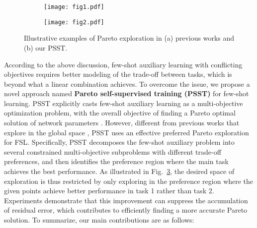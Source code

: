 \documentclass[final]{cvpr}
\begin{document}
\begin{figure}
	
	\begin{subfigure}{0.46\linewidth}
		\texttt{[image: fig1.pdf]}\label{ablation}
 
		\caption{}
	\end{subfigure}
	\begin{subfigure}{0.46\linewidth}
		\texttt{[image: fig2.pdf]}\label{entropy}
 
		\caption{}
	\end{subfigure}
	\caption{Illustrative examples of Pareto exploration in (a) previous works and (b) our PSST.}\label{figtsn}
\end{figure}


According to the above discussion, few-shot auxiliary learning with conflicting objectives requires better modeling of the trade-off between tasks, which is beyond what a linear combination achieves. To overcome the issue, we propose a novel approach named \textbf{Pareto self-supervised training (PSST)} for few-shot learning. PSST explicitly casts few-shot auxiliary learning as a multi-objective optimization problem, with the overall objective of finding a Pareto optimal solution of network parameters \cite{LinZ0ZK19,ma2020continuous}.  
However, different from previous works that explore in the global space {\cite{ma2020continuous}}, PSST uses an effective preferred Pareto exploration for FSL. Specifically, PSST decomposes the few-shot auxiliary problem into several constrained multi-objective subproblems with different trade-off preferences, and then identifies the preference region where the main task achieves the best performance. As illustrated in Fig.~\ref{figtsn}, the desired space of exploration is thus restricted by only exploring in the preference region where the given points achieve better performance in task 1 rather than task 2. Experiments demonstrate that this improvement can suppress the accumulation of residual error, which contributes to efficiently finding a more accurate Pareto solution. To summarize, our main contributions are as follows:
\end{document}
